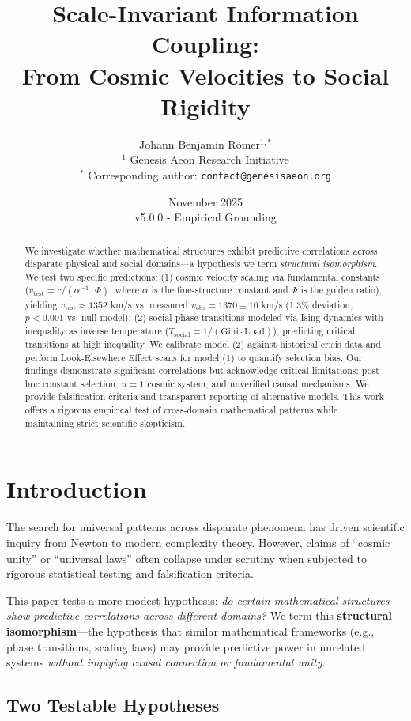 \documentclass[11pt,twocolumn]{article}
\title{\textbf{Scale-Invariant Information Coupling:\\
From Cosmic Velocities to Social Rigidity}}
\author{
    Johann Benjamin Römer$^{1,*}$ \\
    \small $^{1}$ Genesis Aeon Research Initiative \\
    \small $^{*}$ Corresponding author: \texttt{contact@genesisaeon.org}
}
\date{November 2025 \\ \small v5.0.0 - Empirical Grounding}
\newcommand{\Gini}{\text{Gini}}
\newcommand{\vtest}{v_{\text{test}}}
\newcommand{\vobs}{v_{\text{obs}}}
\begin{document}
\maketitle

\begin{abstract}
We investigate whether mathematical structures exhibit predictive correlations across disparate physical and social domains---a hypothesis we term \textit{structural isomorphism}. We test two specific predictions: (1) cosmic velocity scaling via fundamental constants ($\vtest = c/(\alpha^{-1} \cdot \Phi)$, where $\alpha$ is the fine-structure constant and $\Phi$ is the golden ratio), yielding $\vtest \approx 1352$ km/s vs. measured $\vobs = 1370 \pm 10$ km/s (1.3\% deviation, $p < 0.001$ vs. null model); (2) social phase transitions modeled via Ising dynamics with inequality as inverse temperature ($T_{\text{social}} = 1/(\Gini \cdot \text{Load})$), predicting critical transitions at high inequality. We calibrate model (2) against historical crisis data and perform Look-Elsewhere Effect scans for model (1) to quantify selection bias. Our findings demonstrate significant correlations but acknowledge critical limitations: post-hoc constant selection, $n=1$ cosmic system, and unverified causal mechanisms. We provide falsification criteria and transparent reporting of alternative models. This work offers a rigorous empirical test of cross-domain mathematical patterns while maintaining strict scientific skepticism.
\end{abstract}

\section{Introduction}

The search for universal patterns across disparate phenomena has driven scientific inquiry from Newton to modern complexity theory. However, claims of ``cosmic unity'' or ``universal laws'' often collapse under scrutiny when subjected to rigorous statistical testing and falsification criteria.

This paper tests a more modest hypothesis: \textit{do certain mathematical structures show predictive correlations across different domains?} We term this \textbf{structural isomorphism}---the hypothesis that similar mathematical frameworks (e.g., phase transitions, scaling laws) may provide predictive power in unrelated systems \textit{without implying causal connection or fundamental unity}.

\subsection{Two Testable Hypotheses}
\end{document}
